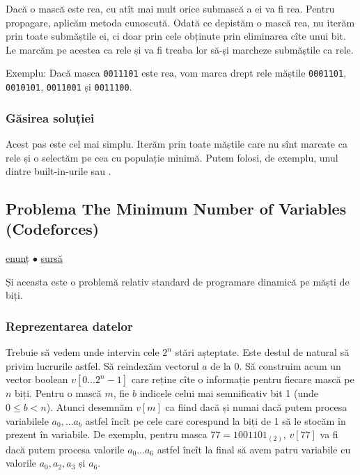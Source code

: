 \documentclass[../main.tex]{subfiles}
\begin{document}
Dacă o mască este rea, cu atît mai mult orice submască a ei va fi rea. Pentru propagare, aplicăm metoda cunoscută. Odată ce depistăm o mască rea, nu iterăm prin toate submăștile ei, ci doar prin cele obținute prin eliminarea cîte unui bit. Le marcăm pe acestea ca rele și va fi treaba lor să-și marcheze submăștile ca rele.

Exemplu: Dacă masca \texttt{0011101} este rea, vom marca drept rele măștile \texttt{0001101}, \texttt{0010101}, \texttt{0011001} și \texttt{0011100}.

\subsubsection*{Găsirea soluției}

Acest pas este cel mai simplu. Iterăm prin toate măștile care nu sînt marcate ca rele și o selectăm pe cea cu populație minimă. Putem folosi, de exemplu, unul dintre built-in-urile  sau .


\subsection{Problema The Minimum Number of Variables (Codeforces)}
\label{problem:the-minimum-number-of-variables}

\href{https://codeforces.com/contest/279/problem/D}{enunț}
$\bullet$
\hyperref[code:the-minimum-number-of-variables]{sursă}

Și aceasta este o problemă relativ standard de programare dinamică pe măști de biți.

\subsubsection*{Reprezentarea datelor}

Trebuie să vedem unde intervin cele $2^n$ stări așteptate. Este destul de natural să privim lucrurile astfel. Să reindexăm vectorul $a$ de la 0. Să construim acum un vector boolean $v[0 \dots 2^n - 1]$ care reține cîte o informație pentru fiecare mască pe $n$ biți. Pentru o mască $m$, fie $b$ indicele celui mai semnificativ bit 1 (unde $0 \leq b < n$). Atunci desemnăm $v[m]$ ca fiind  dacă și numai dacă putem procesa variabilele $a_0, \dots a_b$ astfel încît pe cele care corespund la biți de 1 să le stocăm în prezent în variabile. De exemplu, pentru masca $77 = 1001101_{(2)}$, $v[77]$ va fi  dacă putem procesa valorile $a_0 \dots a_6$ astfel încît la final să avem patru variabile cu valorile $a_0, a_2, a_3$ și $a_6$.
\end{document}
